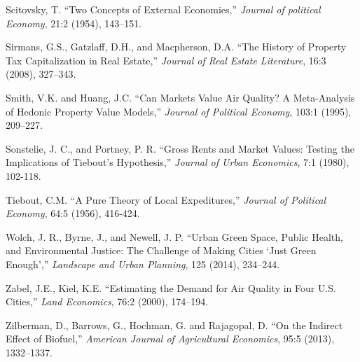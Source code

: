 \documentclass[ecta,nameyear,draft]{econsocart}
\theoremstyle{plain}
\theoremstyle{remark}
\begin{document}
\begin{thebibliography}{}

\textup{Scitovsky, T.} %
``Two Concepts of External Economies,''
\textit{Journal of political Economy}, 21:2 (1954), 143--151.
\endbibitem


\textup{Sirmans, G.S., Gatzlaff, D.H., and Macpherson, D.A.} %
``The History of Property Tax Capitalization in Real Estate,''
\textit{Journal of Real Estate Literature}, 16:3 (2008), 327--343.
\endbibitem


\textup{Smith, V.K. and Huang, J.C.} %
``Can Markets Value Air Quality? A Meta-Analysis of Hedonic Property Value Models,''
\textit{Journal of Political Economy}, 103:1 (1995), 209--227.
\endbibitem


\textup{Sonstelie, J. C., and Portney, P. R.} %
``Gross Rents and Market Values: Testing the Implications of Tiebout's Hypothesis,''
\textit{Journal of Urban Economics}, 7:1 (1980), 102-118.
\endbibitem

\textup{Tiebout, C.M.} %
``A Pure Theory of Local Expeditures,''
\textit{Journal of Political Economy}, 64:5 (1956), 416-424.
\endbibitem



\textup{Wolch, J. R., Byrne, J., and Newell, J. P.} %
``Urban Green Space, Public Health, and Environmental Justice: The Challenge of Making Cities ‘Just Green Enough’,''
\textit{Landscape and Urban Planning}, 125 (2014), 234--244.
\endbibitem



\textup{Zabel, J.E., Kiel, K.E.} %
``Estimating the Demand for Air Quality in Four U.S. Cities,''
\textit{Land Economics}, 76:2 (2000), 174--194.
\endbibitem

\textup{Zilberman, D., Barrows, G., Hochman, G. and Rajagopal, D.} %
``On the Indirect Effect of Biofuel,''
\textit{American Journal of Agricultural Economics}, 95:5 (2013), 1332--1337.
\endbibitem


\end{thebibliography}
\end{document}

